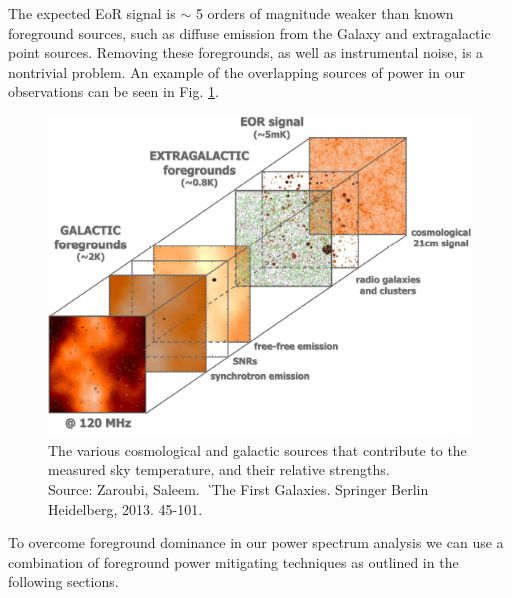 \documentclass[a0,landscape]{a0poster}
\begin{document}
\begin{multicols}{4}
The expected EoR signal is $\sim$ 5 orders of magnitude weaker than known foreground sources, such as diffuse emission from the Galaxy and extragalactic point sources. Removing these foregrounds, as well as instrumental noise, is a nontrivial problem. An example of the overlapping sources of power in our observations can be seen in Fig. \ref{fig:foregroundsrcs}.


\begin{figure}[H]
\centering
\includegraphics[width=0.55\linewidth]{figures/foreground_figure.png}
\caption{The various cosmological and galactic sources that contribute to the measured sky temperature, and their relative strengths.\\\hspace{\textwidth}
Source: Zaroubi, Saleem. \textit`{The First Galaxies}. Springer Berlin Heidelberg, 2013. 45-101.}\label{fig:foregroundsrcs}
\end{figure}
To overcome foreground dominance in our power spectrum analysis we can use a combination of foreground power mitigating techniques as outlined in the following sections.


\end{multicols}
\end{document}
